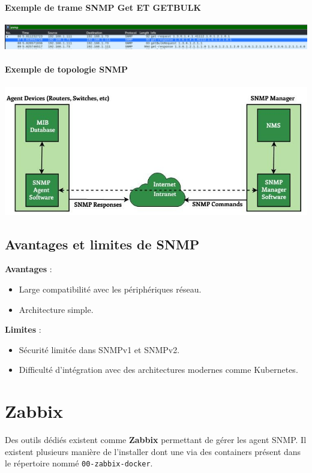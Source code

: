 \documentclass[french, 12pt]{article}%
\newcommand{\itemE}{\item[$\bullet$]}
\begin{document}
\paragraph{Exemple de trame SNMP Get ET GETBULK}
\begin{center}
\includegraphics[scale=0.7]{./ressource/exSnmpGet}
\end{center}


\paragraph{Exemple de topologie SNMP}
\begin{center}
\includegraphics[scale=0.7]{./ressource/SNMP_archi}
\end{center}


\subsection*{Avantages et limites de SNMP}
\textbf{Avantages} :
\begin{itemize}
    \itemE Large compatibilité avec les périphériques réseau.
    \itemE Architecture simple.
\end{itemize}
\textbf{Limites} :
\begin{itemize}
    \itemE Sécurité limitée dans SNMPv1 et SNMPv2.
    \itemE Difficulté d’intégration avec des architectures modernes comme Kubernetes.
\end{itemize}

\section{Zabbix}
Des outils dédiés existent comme \textbf{Zabbix} permettant de gérer les agent SNMP. Il existent plusieurs manière de l'installer dont une via des containers présent dans le répertoire nommé \verb?00-zabbix-docker?.
\end{document}
